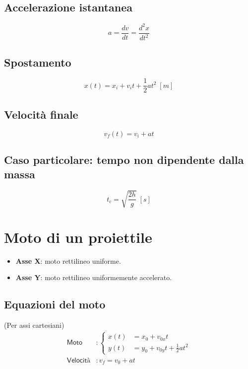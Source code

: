         \subsection*{Accelerazione istantanea}
            \begin{equation*}
                a = \frac{dv}{dt} = \frac{d^2x}{dt^2}
            \end{equation*}

        \subsection*{Spostamento}
            \begin{equation*}
                x(t) = x_i + v_it + \frac{1}{2}at^2 \; [m]
            \end{equation*}

        \subsection*{Velocità finale}
            \begin{equation*}
                v_f(t) = v_{i} + at
            \end{equation*}
    
        \subsection*{Caso particolare: tempo non dipendente dalla massa}
            \begin{equation*}
                t_c=\sqrt{\frac{2h}{g}} \; [s]
            \end{equation*}

    \section*{Moto di un proiettile} 
        \begin{itemize}
            \item \textbf{Asse X}: moto rettilineo uniforme.
            \item \textbf{Asse Y}: moto rettilineo uniformemente accelerato.
        \end{itemize}
        \subsection*{Equazioni del moto}
        (Per assi cartesiani)
        \begin{align}
            \textsf{Moto} &: \begin{cases}
                    x(t) &= x_0 + v_{0x}t \\
                    y(t) &= y_0 + v_{0y}t + \frac{1}{2}at^2
                \end{cases} \\
                \textsf{Velocità} &: v_{f} = v_{0} + at
        \end{align}

